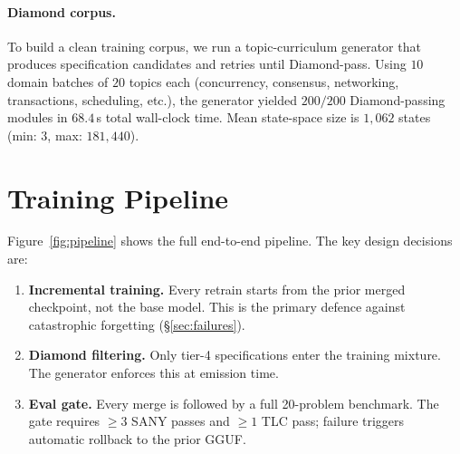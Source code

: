 \documentclass[10pt,twocolumn]{article}
\begin{document}
\paragraph{Diamond corpus.}
To build a clean training corpus, we run a topic-curriculum generator that
produces specification candidates and retries until Diamond-pass.
Using $10$ domain batches of $20$ topics each (concurrency, consensus,
networking, transactions, scheduling, etc.), the generator yielded $200/200$
Diamond-passing modules in $68.4$\,s total wall-clock time.
Mean state-space size is $1{,}062$ states (min: $3$, max: $181{,}440$).

\section{Training Pipeline}
\label{sec:pipeline}

Figure~\ref{fig:pipeline} shows the full end-to-end pipeline.
The key design decisions are:

\begin{enumerate}[leftmargin=1.4em,topsep=2pt,itemsep=1pt]
\item \textbf{Incremental training.} Every retrain starts from the prior merged
  checkpoint, not the base model. This is the primary defence against
  catastrophic forgetting (\S\ref{sec:failures}).
\item \textbf{Diamond filtering.} Only tier-4 specifications enter the training
  mixture. The generator enforces this at emission time.
\item \textbf{Eval gate.} Every merge is followed by a full 20-problem benchmark.
  The gate requires $\geq\!3$ SANY passes and $\geq\!1$ TLC pass; failure
  triggers automatic rollback to the prior GGUF.
\end{enumerate}
\end{document}
